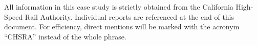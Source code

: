 All information in this case study is strictly obtained from the California High-Speed Rail Authority. Individual reports are referenced at the end of this document. For efficiency, direct mentions will be marked with the acronym “CHSRA” instead of the whole phrase.\par

\titlespacing*{\chapter}{0pt}{12pt}{0pt}